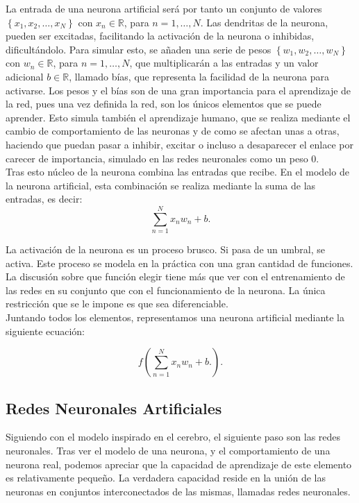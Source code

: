 La entrada de una neurona artificial será por tanto un conjunto de valores $\left\lbrace x_1,x_2,\ldots,x_N\right\rbrace$ con $x_n \in \mathbb{R}$, para $n = 1,\ldots,N$. Las dendritas de la neurona, pueden ser excitadas, facilitando la activación de la neurona o inhibidas, dificultándolo. Para simular esto, se añaden una serie de pesos $\left\lbrace w_1,w_2,\ldots,w_N\right\rbrace$ con $w_n \in \mathbb{R}$, para $n = 1,\ldots,N$, que multiplicarán a las entradas y un valor adicional $b \in \mathbb{R}$, llamado bías, que representa la facilidad de la neurona para activarse. Los pesos y el bías son de una gran importancia para el aprendizaje de la red, pues una vez definida la red, son los únicos elementos que se puede aprender. Esto simula también el aprendizaje humano, que se realiza mediante el cambio de comportamiento de las neuronas y de como se afectan unas a otras, haciendo que puedan pasar a inhibir, excitar o incluso a desaparecer el enlace por carecer de importancia, simulado en las redes neuronales como un peso 0.\\

Tras esto núcleo de la neurona combina las entradas que recibe. En el modelo de la neurona artificial, esta combinación se realiza mediante la suma de las entradas, es decir: $$\sum^N_{n=1} x_n w_n + b. $$

La activación de la neurona es un proceso brusco. Si pasa de un umbral, se activa. Este proceso se modela en la práctica con una gran cantidad de funciones. La discusión sobre que función elegir tiene más que ver con el entrenamiento de las redes en su conjunto que con el funcionamiento de la neurona. La única restricción que se le impone es que sea diferenciable.\\

Juntando todos los elementos, representamos una neurona artificial mediante la siguiente ecuación:

$$f\left( \sum^N_{n=1} x_n w_n + b. \right).$$

\subsection{Redes Neuronales Artificiales}

Siguiendo con el modelo inspirado en el cerebro, el siguiente paso son las redes neuronales. Tras ver el modelo de una neurona, y el comportamiento de una neurona real, podemos apreciar que la capacidad de aprendizaje de este elemento es relativamente pequeño. La verdadera capacidad reside en la unión de las neuronas en conjuntos interconectados de las mismas, llamadas redes neuronales.\\
 
